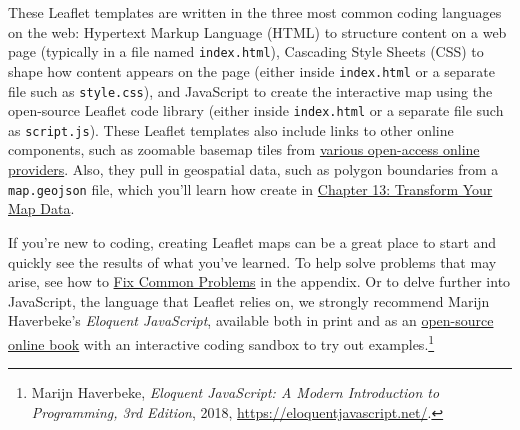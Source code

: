 \documentclass[
  english,
]{book}
\begin{document}
These Leaflet templates are written in the three most common coding languages on the web: Hypertext Markup Language (HTML) to structure content on a web page (typically in a file named \texttt{index.html}), Cascading Style Sheets (CSS) to shape how content appears on the page (either inside \texttt{index.html} or a separate file such as \texttt{style.css}), and JavaScript to create the interactive map using the open-source Leaflet code library (either inside \texttt{index.html} or a separate file such as \texttt{script.js}). These Leaflet templates also include links to other online components, such as zoomable basemap tiles from \href{https://leaflet-extras.github.io/leaflet-providers/preview/}{various open-access online providers}. Also, they pull in geospatial data, such as polygon boundaries from a \texttt{map.geojson} file, which you'll learn how create in \href{transform.html}{Chapter 13: Transform Your Map Data}.

If you're new to coding, creating Leaflet maps can be a great place to start and quickly see the results of what you've learned. To help solve problems that may arise, see how to \href{fix.html}{Fix Common Problems} in the appendix. Or to delve further into JavaScript, the language that Leaflet relies on, we strongly recommend Marijn Haverbeke's \emph{Eloquent JavaScript}, available both in print and as an \href{https://eloquentjavascript.net/}{open-source online book} with an interactive coding sandbox to try out examples.\footnote{Marijn Haverbeke, \emph{Eloquent {JavaScript}: {A Modern Introduction} to {Programming}, 3rd {Edition}}, 2018, \url{https://eloquentjavascript.net/}.}
\end{document}
